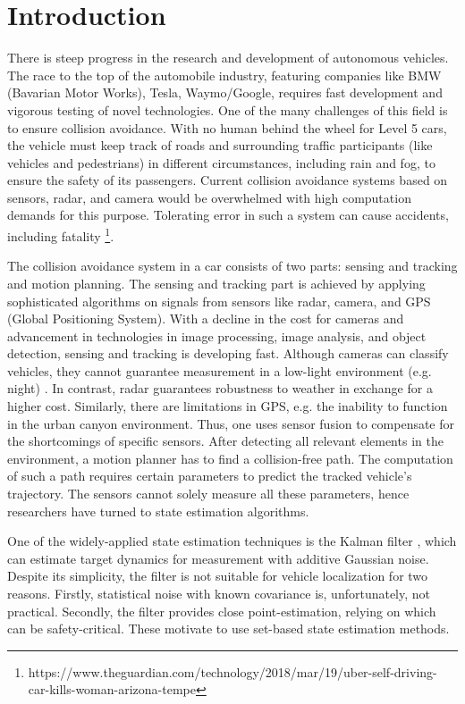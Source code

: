 \chapter{Introduction} \label{ch:intro}
There is steep progress in the research and development of autonomous vehicles. The race to the top of the automobile industry, featuring companies like BMW (Bavarian Motor Works), Tesla, Waymo/Google, requires fast development and vigorous testing of novel technologies. One of the many challenges of this field is to ensure collision avoidance. With no human behind the wheel for Level 5 \cite{SAE2014} cars, the vehicle must keep track of roads and surrounding traffic participants (like vehicles and pedestrians) in different circumstances, including rain and fog, to ensure the safety of its passengers. Current collision avoidance systems based on sensors, radar, and camera would be overwhelmed with high computation demands for this purpose. Tolerating error in such a system can cause accidents, including fatality \footnote{https://www.theguardian.com/technology/2018/mar/19/uber-self-driving-car-kills-woman-arizona-tempe}.


The collision avoidance system in a car consists of two parts: sensing and tracking and motion planning. The sensing and tracking part is achieved by applying sophisticated algorithms on signals from sensors like radar, camera, and GPS (Global Positioning System). With a decline in the cost for cameras and advancement in technologies in image processing, image analysis, and object detection, sensing and tracking is developing fast. Although cameras can classify vehicles, they cannot guarantee measurement in a low-light environment (e.g. night) \cite{Hirz2018}. In contrast, radar guarantees robustness to weather in exchange for a higher cost. Similarly, there are limitations in GPS, e.g. the inability to function in the urban canyon environment. Thus, one uses sensor fusion to compensate for the shortcomings of specific sensors. After detecting all relevant elements in the environment, a motion planner has to find a collision-free path. The computation of such a path requires certain parameters to predict the tracked vehicle's trajectory. The sensors cannot solely measure all these parameters, hence researchers have turned to state estimation algorithms.

One of the widely-applied state estimation techniques is the Kalman filter \cite{Kalman}, which can estimate target dynamics for measurement with additive Gaussian noise. Despite its simplicity, the filter is not suitable for vehicle localization for two reasons. Firstly, statistical noise with known covariance is, unfortunately, not practical. Secondly, the filter provides close point-estimation, relying on which can be safety-critical. These motivate to use set-based state estimation methods.

